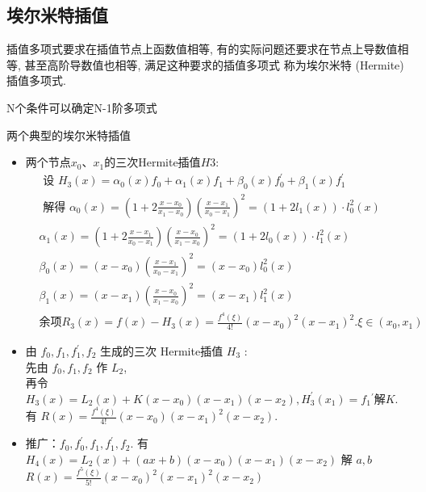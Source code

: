 \subsection{埃尔米特插值}
插值多项式要求在插值节点上函数值相等, 有的实际问题还要求在节点上导数值相等, 甚至高阶导数值也相等, 满足这种要求的插值多项式
称为埃尔米特 (Hermite)插值多项式.

\begin{note}
  N个条件可以确定N-1阶多项式
\end{note}

两个典型的埃尔米特插值
\begin{itemize}
  \item 两个节点$x_{0}$、$x_{1}$的三次Hermite插值$H3$:
  $$
  \begin{aligned}
  &\text { 设 } H_{3}(x)=\alpha_{0}(x) f_{0}+\alpha_{1}(x) f_{1}+\beta_{0}(x) f_{0}^{\prime}+\beta_{1}(x) f_{1}^{\prime} \\
  &\text { 解得 } \alpha_{0}(x)=\left(1+2 \frac{x-x_{0}}{x_{1}-x_{0}}\right)\left(\frac{x-x_{1}}{x_{0}-x_{1}}\right)^{2}=\left(1+2 l_{1}(x)\right) \cdot l_{0}^{2}(x) \\
  &\alpha_{1}(x)=\left(1+2 \frac{x-x_{1}}{x_{0}-x_{1}}\right)\left(\frac{x-x_{0}}{x_{1}-x_{0}}\right)^{2}=\left(1+2 l_{0}(x)\right) \cdot l_{1}^{2}(x) \\
  &\beta_{0}(x)=\left(x-x_{0}\right)\left(\frac{x-x_{1}}{x_{0}-x_{1}}\right)^{2}=\left(x-x_{0}\right) l_{0}^{2}(x) \\
  &\beta_{1}(x)=\left(x-x_{1}\right)\left(\frac{x-x_{0}}{x_{1}-x_{0}}\right)^{2}=\left(x-x_{1}\right) l_{1}^{2}(x) \\
  &余项 R_{3}(x)=f(x)-H_{3}(x)=\frac{f^{4}(\xi)}{4 !}\left(x-x_{0}\right)^{2}\left(x-x_{1}\right)^{2} . \xi \in\left(x_{0}, x_{1}\right)
  \end{aligned}
  $$
  \item 由 $f_{0}, f_{1}, f_{1}^{\prime}, f_{2}$ 生成的三次 Hermite插值 $H_{3}$ : \\
  先由 $f_{0}, f_{1}, f_{2}$ 作 $L_{2}$, \\
  再令 $H_{3}(x)=L_{2}(x)+K\left(x-x_{0}\right)\left(x-x_{1}\right)\left(x-x_{2}\right), H_{3}^{\prime}\left(x_{1}\right)=f_{1}{ }^{\prime}\text {解} K$.\\
  有 $R(x)=\frac{f^{4}(\xi)}{4 !}\left(x-x_{0}\right)\left(x-x_{1}\right)^{2}\left(x-x_{2}\right)$.
  \item 推广：$f_{0}, f_{0}^{\prime}, f_{1}, f_{1}^{\prime}, f_{2}$. 有\\
  $H_{4}(x)=L_{2}(x)+(a x+b)\left(x-x_{0}\right)\left(x-x_{1}\right)\left(x-x_{2}\right)$ 解 $a,b$ \\
  $R(x)=\frac{f^{5}(\xi)}{5 !}\left(x-x_{0}\right)^{2}\left(x-x_{1}\right)^{2}\left(x-x_{2}\right)$
\end{itemize}

